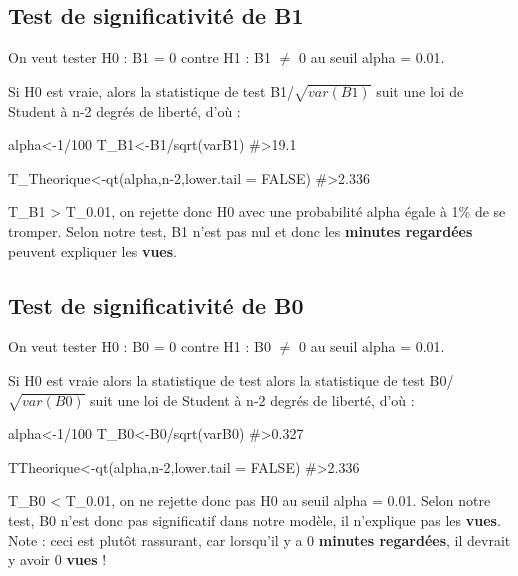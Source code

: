 \hypertarget{test-de-significativituxe9-de-b1}{%
\subsection{Test de significativité de
B1}\label{test-de-significativituxe9-de-b1}}

On veut tester H0 : B1 = 0 contre H1 : B1 \(\neq\) 0 au seuil alpha =
0.01.

Si H0 est vraie, alors la statistique de test B1/\(\sqrt{var(B1)}\) suit
une loi de Student à n-2 degrés de liberté, d'où :

\begin{Schunk}
\begin{Sinput}
alpha<-1/100
T_B1<-B1/sqrt(varB1)
#>19.1

T_Theorique<-qt(alpha,n-2,lower.tail = FALSE)
#>2.336
\end{Sinput}
\end{Schunk}

\textbar T\_B1\textbar{} \textgreater{} T\_0.01, on rejette donc H0 avec
une probabilité alpha égale à 1\% de se tromper. Selon notre test, B1
n'est pas nul et donc les \textbf{minutes regardées} peuvent expliquer
les \textbf{vues}.

\hypertarget{test-de-significativituxe9-de-b0}{%
\subsection{Test de significativité de
B0}\label{test-de-significativituxe9-de-b0}}

On veut tester H0 : B0 = 0 contre H1 : B0 \(\neq\) 0 au seuil alpha =
0.01.

Si H0 est vraie alors la statistique de test alors la statistique de
test B0/\(\sqrt{var(B0)}\) suit une loi de Student à n-2 degrés de
liberté, d'où :

\begin{Schunk}
\begin{Sinput}
alpha<-1/100
T_B0<-B0/sqrt(varB0)
#>0.327

TTheorique<-qt(alpha,n-2,lower.tail = FALSE)
#>2.336
\end{Sinput}
\end{Schunk}

\textbar T\_B0\textbar{} \textless{} T\_0.01, on ne rejette donc pas H0
au seuil alpha = 0.01. Selon notre test, B0 n'est donc pas significatif
dans notre modèle, il n'explique pas les \textbf{vues}. Note : ceci est
plutôt rassurant, car lorsqu'il y a 0 \textbf{minutes regardées}, il
devrait y avoir 0 \textbf{vues} !


